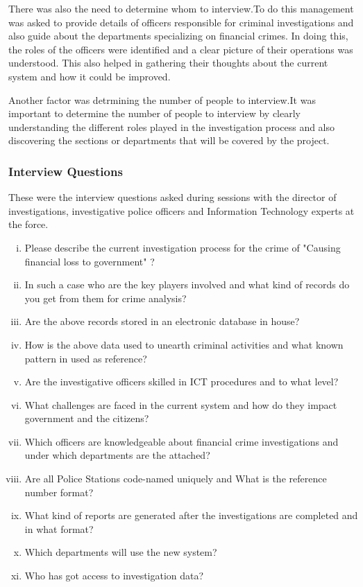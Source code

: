 \noindent There was also the need to determine whom to interview.To do  this management was asked to provide details of officers responsible for criminal investigations and also guide about the departments specializing on financial crimes. In doing this, the roles of the officers were identified and a clear picture of their operations was understood. This also helped in gathering their thoughts about the current system and how it could be improved.

\noindent Another factor was detrmining the number of people to interview.It was important to determine the number of people to interview by clearly understanding the different roles played in the investigation process and also discovering the sections or departments that will be covered by the project.

\subsubsection{Interview Questions}

\noindent These were the interview questions asked during sessions with the director of investigations, investigative police officers and Information Technology experts at the force.

\begin{enumerate}[(i)]
\item Please describe the current investigation process for the crime of "Causing financial loss to government" ?
\item In such a case who are the key players involved and what kind of records do you get from them for crime analysis?
\item Are the above records stored in an electronic database in house?
\item How is the above data used to unearth criminal activities and what known pattern in used as reference?
\item Are the investigative officers skilled in ICT procedures and to what level?
\item What challenges are faced in the current system and how do they impact government and the citizens?
\item Which officers are knowledgeable about financial crime investigations and under which departments are the attached?
\item Are all Police Stations code-named uniquely and What is the reference number format?
\item What kind of reports are generated after the investigations are completed and in what format?
\item Which departments will use the new system?
\item Who has got access to investigation data?
\end{enumerate}





